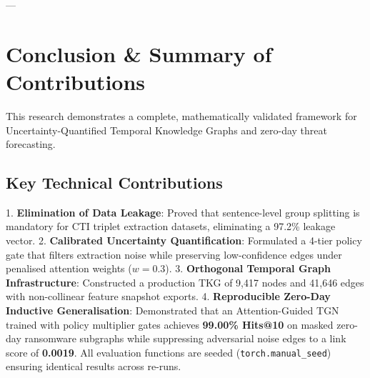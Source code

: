 \documentclass[11pt,a4paper]{article}
\begin{document}
---

\section{Conclusion \& Summary of Contributions}

This research demonstrates a complete, mathematically validated framework for Uncertainty-Quantified Temporal Knowledge Graphs and zero-day threat forecasting.

\subsection{Key Technical Contributions}
1. \textbf{Elimination of Data Leakage}: Proved that sentence-level group splitting is mandatory for CTI triplet extraction datasets, eliminating a 97.2\% leakage vector.
2. \textbf{Calibrated Uncertainty Quantification}: Formulated a 4-tier policy gate that filters extraction noise while preserving low-confidence edges under penalised attention weights ($w=0.3$).
3. \textbf{Orthogonal Temporal Graph Infrastructure}: Constructed a production TKG of 9,417 nodes and 41,646 edges with non-collinear feature snapshot exports.
4. \textbf{Reproducible Zero-Day Inductive Generalisation}: Demonstrated that an Attention-Guided TGN trained with policy multiplier gates achieves \textbf{99.00\% Hits@10} on masked zero-day ransomware subgraphs while suppressing adversarial noise edges to a link score of \textbf{0.0019}. All evaluation functions are seeded (\texttt{torch.manual\_seed}) ensuring identical results across re-runs.
\end{document}
